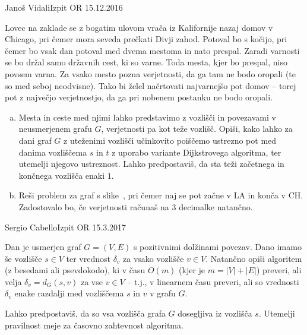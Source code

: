 \begin{naloga}{Janoš Vidali}{Izpit OR 15.12.2016}
\begin{vprasanje}[zaklad]
Lovec na zaklade se z bogatim ulovom
vrača iz Kalifornije nazaj domov v Chicago,
pri čemer mora seveda prečkati Divji zahod.
Potoval bo s kočijo,
pri čemer bo vsak dan potoval med dvema mestoma in nato prespal.
Zaradi varnosti se bo držal samo državnih cest, ki so varne.
Toda mesta, kjer bo prespal, niso povsem varna.
Za vsako mesto pozna verjetnosti,
da ga tam ne bodo oropali (te so med seboj neodvisne).
Tako bi želel načrtovati najvarnejšo pot domov
-- torej pot z največjo verjetnostjo,
da ga pri nobenem postanku ne bodo oropali.

\begin{enumerate}[(a)]
\item Mesta in ceste med njimi lahko predstavimo z vozlišči in povezavami
v ne\-usme\-rje\-nem grafu $G$, verjetnosti pa kot teže vozlišč.
Opiši, kako lahko za dani graf $G$ z uteženimi vozlišči
učinkovito poiščemo ustrezno pot med danima vozliščema $s$ in $t$
z uporabo variante Dijkstrovega algoritma,
ter utemelji njegovo ustreznost.
Lahko predpostaviš, da sta teži začetnega in končnega vozlišča enaki $1$.

\item Reši problem za graf s slike~\fig{},
pri čemer naj se pot začne v LA in konča v CH.
Zadostovalo bo, če verjetnosti računaš na $3$ decimalke natančno.
\end{enumerate}

\begin{slika}
\pgfslika
{}
\end{slika}
\end{vprasanje}
\begin{odgovor}
\end{odgovor}
\end{naloga}


\begin{naloga}{Sergio Cabello}{Izpit OR 15.3.2017}
\begin{vprasanje}[razdalje]
Dan je usmerjen graf $G = (V, E)$ s pozitivnimi dolžinami povezav.
Dano imamo še vozlišče $s \in V$
ter vrednost $\delta_v$ za vsako vozlišče $v \in V$.
Natančno opiši algoritem (z besedami ali psevdokodo),
ki v času $O(m)$ (kjer je $m = |V| + |E|$) preveri,
ali velja $\delta_v = d_G(s, v)$ za vse $v \in V$
-- t.j., v linearnem času preveri,
ali so vrednosti $\delta_v$
enake razdalji med vozliščema $s$ in $v$ v grafu $G$.

Lahko predpostaviš, da so vsa vozlišča grafa $G$ dosegljiva iz vozlišča $s$.
Utemelji pravilnost meje za časovno zahtevnost algoritma.
\end{vprasanje}
\begin{odgovor}
\end{odgovor}
\end{naloga}


